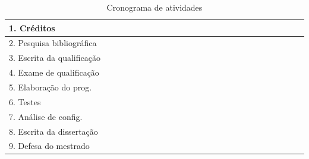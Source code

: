 \documentclass[12pt]{article}
\begin{document}
\begin{table}[H]
\begin{tabular}{|l|c|c|c|c|c|c|c|c|c|c|c|c|c|c|c|c|c|c|c|c|c|c|c|c|}
	1. Créditos					& \y & \y & \y & \y & \y & \y & \y & \y & \y & \y & \y & \y & \x & \x & \x & \x & \x & \x & \x & \x & \x & \x & \x & \x\\ \hline
	2. Pesquisa bibliográfica	& \y & \y & \y & \y & \y & \y & \y & \y & \y & \y & \y & \y & \y & \y & \y & \y & \y & \y & \y & \y & \y & \y & \y & \x\\ \hline
	3. Escrita da qualificação	& \x & \x & \x & \x & \x & \x & \x & \x & \x & \x & \y & \y & \y & \x & \x & \x & \x & \x & \x & \x & \x & \x & \x & \x\\ \hline
	4. Exame de qualificação	& \x & \x & \x & \x & \x & \x & \x & \x & \x & \x & \x & \x & \x & \y & \x & \x & \x & \x & \x & \x & \x & \x & \x & \x\\ \hline
	5. Elaboração do prog.		& \y & \y & \y & \y & \y & \y & \y & \y & \y & \y & \x & \x & \y & \y & \y & \y & \y & \y & \x & \x & \x & \x & \x & \x\\ \hline
	6. Testes					& \x & \x & \x & \x & \x & \x & \x & \x & \x & \x & \x & \x & \x & \x & \x & \x & \y & \y & \x & \x & \x & \x & \x & \x\\ \hline
	7. Análise de config.		& \x & \x & \x & \x & \x & \x & \x & \x & \x & \x & \x & \x & \x & \x & \x & \x & \x & \x & \y & \y & \y & \x & \x & \x\\ \hline
	8. Escrita da dissertação	& \x & \x & \x & \x & \x & \x & \x & \x & \x & \x & \x & \x & \x & \x & \x & \x & \x & \x & \x & \x & \x & \y & \y & \y\\ \hline
	9. Defesa do mestrado		& \x & \x & \x & \x & \x & \x & \x & \x & \x & \x & \x & \x & \x & \x & \x & \x & \x & \x & \x & \x & \x & \x & \x & \y\\ \hline	
	\end{tabular}
\caption{Cronograma de atividades}
\label{tab:cronograma}
\end{table}
\endgroup

\newpage
\end{document}
